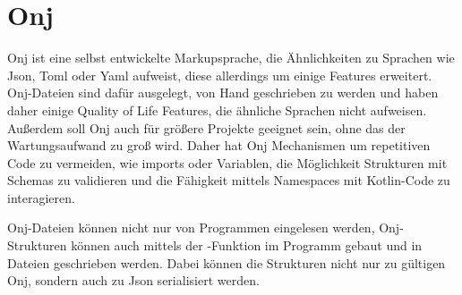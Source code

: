 
\section{Onj}\label{sec:onj}

Onj ist eine selbst entwickelte Markupsprache, die Ähnlichkeiten zu Sprachen wie Json, Toml oder Yaml aufweist,
diese allerdings um einige Features erweitert.
Onj-Dateien sind dafür ausgelegt, von Hand geschrieben zu werden und haben daher einige Quality of Life Features, die
ähnliche Sprachen nicht aufweisen.
Außerdem soll Onj auch für größere Projekte geeignet sein, ohne das der Wartungsaufwand zu groß wird.
Daher hat Onj Mechanismen um repetitiven Code zu vermeiden, wie imports oder Variablen, die Möglichkeit Strukturen
mit Schemas zu validieren und die Fähigkeit mittels Namespaces mit Kotlin-Code zu interagieren.

Onj-Dateien können nicht nur von Programmen eingelesen werden, Onj-Strukturen können auch mittels der
-Funktion im Programm gebaut und in Dateien geschrieben werden.
Dabei können die Strukturen nicht nur zu gültigen Onj, sondern auch zu Json serialisiert werden.









